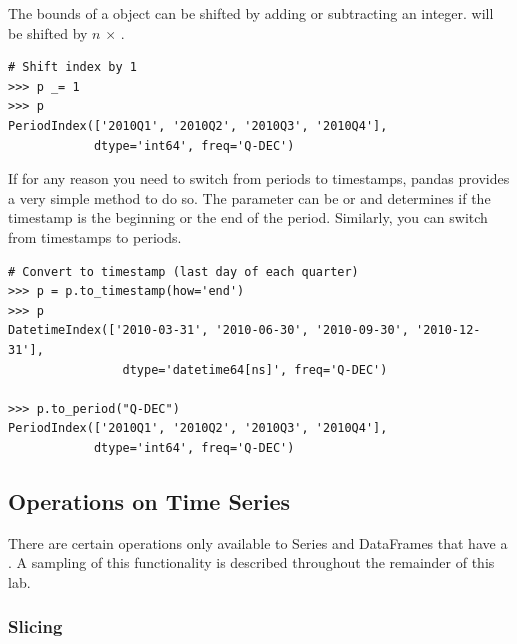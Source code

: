 The bounds of a  object can be shifted by adding or subtracting an integer.
  will be shifted by $n$ $\times$ .

\begin{lstlisting}
# Shift index by 1
>>> p _= 1
>>> p
PeriodIndex(['2010Q1', '2010Q2', '2010Q3', '2010Q4'],
            dtype='int64', freq='Q-DEC')
\end{lstlisting}

If for any reason you need to switch from periods to timestamps, pandas provides a very simple method to do so.
The  parameter can be  or  and determines if the timestamp is the beginning or the end of the period.
Similarly, you can switch from timestamps to periods.

\begin{lstlisting}
# Convert to timestamp (last day of each quarter)
>>> p = p.to_timestamp(how='end')
>>> p
DatetimeIndex(['2010-03-31', '2010-06-30', '2010-09-30', '2010-12-31'],
                dtype='datetime64[ns]', freq='Q-DEC')

>>> p.to_period("Q-DEC")
PeriodIndex(['2010Q1', '2010Q2', '2010Q3', '2010Q4'],
            dtype='int64', freq='Q-DEC')

\end{lstlisting}

\subsection*{Operations on Time Series}

There are certain operations only available to Series and DataFrames that have a . A sampling of this functionality is described throughout the remainder of this lab.
\subsubsection*{Slicing}

